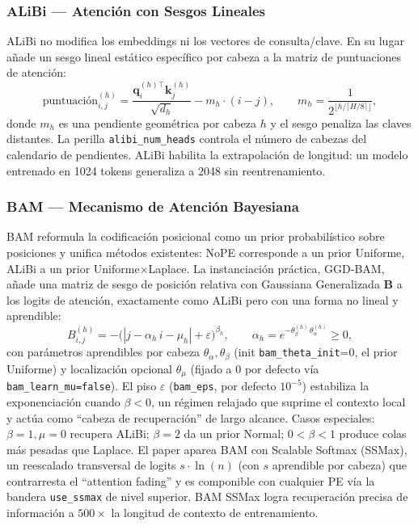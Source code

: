\subsubsection{ALiBi --- Atención con Sesgos Lineales}

ALiBi \citep{press_alibi_2022} no modifica los embeddings ni los vectores
de consulta/clave. En su lugar añade un sesgo lineal estático específico
por cabeza a la matriz de puntuaciones de atención:
\[
\text{puntuación}_{i,j}^{(h)} = \frac{\mathbf{q}_i^{(h)\top}\mathbf{k}_j^{(h)}}{\sqrt{d_h}} - m_h \cdot (i - j), \qquad m_h = \frac{1}{2^{\lfloor h / \lceil H/8 \rceil \rfloor}},
\]
donde $m_h$ es una pendiente geométrica por cabeza $h$ y el sesgo penaliza
las claves distantes. La perilla \texttt{alibi\_num\_heads} controla el
número de cabezas del calendario de pendientes. ALiBi habilita la
extrapolación de longitud: un modelo entrenado en 1024 tokens generaliza
a 2048 sin reentrenamiento.

\subsubsection{BAM --- Mecanismo de Atención Bayesiana}

BAM \citep{bianchessi_bam_2025} reformula la codificación posicional como
un prior probabilístico sobre posiciones y unifica métodos existentes:
NoPE corresponde a un prior Uniforme, ALiBi a un prior
Uniforme$\times$Laplace. La instanciación práctica, GGD-BAM, añade una
matriz de sesgo de posición relativa con Gaussiana Generalizada
$\mathbf{B}$ a los logits de atención, exactamente como ALiBi pero con
una forma no lineal y aprendible:
\[
B_{i,j}^{(h)} = -\bigl(|j - \alpha_h \, i - \mu_h| + \varepsilon\bigr)^{\beta_h}, \qquad \alpha_h = e^{-\theta_\beta^{(h)}\,\theta_\alpha^{(h)}} \ge 0,
\]
con parámetros aprendibles por cabeza $\theta_\alpha, \theta_\beta$ (init
\texttt{bam\_theta\_init}=0, el prior Uniforme) y localización opcional
$\theta_\mu$ (fijado a 0 por defecto vía \texttt{bam\_learn\_mu=false}). El
piso $\varepsilon$ (\texttt{bam\_eps}, por defecto $10^{-5}$) estabiliza la
exponenciación cuando $\beta < 0$, un régimen relajado que suprime el
contexto local y actúa como ``cabeza de recuperación'' de largo alcance.
Casos especiales: $\beta=1, \mu=0$ recupera ALiBi; $\beta=2$ da un prior
Normal; $0<\beta<1$ produce colas más pesadas que Laplace. El paper
aparea BAM con Scalable Softmax (SSMax), un reescalado transversal de
logits $s\cdot\ln(n)$ (con $s$ aprendible por cabeza) que contrarresta el
``attention fading'' y es componible con cualquier PE vía la bandera
\texttt{use\_ssmax} de nivel superior. BAM SSMax logra recuperación precisa
de información a $500\times$ la longitud de contexto de entrenamiento.

